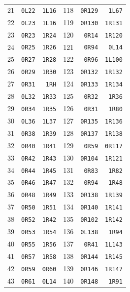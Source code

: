 \begin{longtable}{@{}rrr@{\hspace{20pt}}rrr@{}}
21 & \texttt{0L22} & \texttt{1L16} & 118 & \texttt{0R129} & \texttt{1L67}\\
22 & \texttt{0L23} & \texttt{1L16} & 119 & \texttt{0R130} & \texttt{1R131}\\
23 & \texttt{0R23} & \texttt{1R24} & 120 & \texttt{0R14} & \texttt{1R120}\\
24 & \texttt{0R25} & \texttt{1R26} & 121 & \texttt{0R94} & \texttt{0L14}\\
25 & \texttt{0R27} & \texttt{1R28} & 122 & \texttt{0R96} & \texttt{1L100}\\
26 & \texttt{0R29} & \texttt{1R30} & 123 & \texttt{0R132} & \texttt{1R132}\\
27 & \texttt{0R31} & \texttt{1RH} & 124 & \texttt{0R133} & \texttt{1R134}\\
28 & \texttt{0L32} & \texttt{1R33} & 125 & \texttt{0R32} & \texttt{1R36}\\
29 & \texttt{0R34} & \texttt{1R35} & 126 & \texttt{0R31} & \texttt{1R80}\\
30 & \texttt{0L36} & \texttt{1L37} & 127 & \texttt{0R135} & \texttt{1R136}\\
31 & \texttt{0R38} & \texttt{1R39} & 128 & \texttt{0R137} & \texttt{1R138}\\
32 & \texttt{0R40} & \texttt{1R41} & 129 & \texttt{0R59} & \texttt{0R117}\\
33 & \texttt{0R42} & \texttt{1R43} & 130 & \texttt{0R104} & \texttt{1R121}\\
34 & \texttt{0R44} & \texttt{1R45} & 131 & \texttt{0R83} & \texttt{1R82}\\
35 & \texttt{0R46} & \texttt{1R47} & 132 & \texttt{0R94} & \texttt{1R48}\\
36 & \texttt{0R48} & \texttt{1R49} & 133 & \texttt{0R138} & \texttt{1R139}\\
37 & \texttt{0R50} & \texttt{1R51} & 134 & \texttt{0R140} & \texttt{1R141}\\
38 & \texttt{0R52} & \texttt{1R42} & 135 & \texttt{0R102} & \texttt{1R142}\\
39 & \texttt{0R53} & \texttt{1R54} & 136 & \texttt{0L138} & \texttt{1R94}\\
40 & \texttt{0R55} & \texttt{1R56} & 137 & \texttt{0R41} & \texttt{1L143}\\
41 & \texttt{0R57} & \texttt{1R58} & 138 & \texttt{0R144} & \texttt{1R145}\\
42 & \texttt{0R59} & \texttt{0R60} & 139 & \texttt{0R146} & \texttt{1R147}\\
43 & \texttt{0R61} & \texttt{0L14} & 140 & \texttt{0R148} & \texttt{1R91}\\

\end{longtable}
